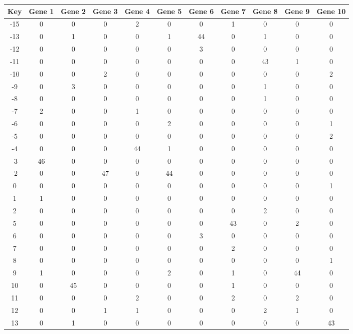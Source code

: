\begin{tabular}{|c|c|c|c|c|c|c|c|c|c|c|}
\hline
Key & Gene 1 & Gene 2 & Gene 3 & Gene 4 & Gene 5 & Gene 6 & Gene 7 & Gene 8 & Gene 9 & Gene 10 \\
\hline
-15 & 0 & 0 & 0 & 2 & 0 & 0 & 1 & 0 & 0 & 0 \\
-13 & 0 & 1 & 0 & 0 & 1 & 44 & 0 & 1 & 0 & 0 \\
-12 & 0 & 0 & 0 & 0 & 0 & 3 & 0 & 0 & 0 & 0 \\
-11 & 0 & 0 & 0 & 0 & 0 & 0 & 0 & 43 & 1 & 0 \\
-10 & 0 & 0 & 2 & 0 & 0 & 0 & 0 & 0 & 0 & 2 \\
-9 & 0 & 3 & 0 & 0 & 0 & 0 & 0 & 1 & 0 & 0 \\
-8 & 0 & 0 & 0 & 0 & 0 & 0 & 0 & 1 & 0 & 0 \\
-7 & 2 & 0 & 0 & 1 & 0 & 0 & 0 & 0 & 0 & 0 \\
-6 & 0 & 0 & 0 & 0 & 2 & 0 & 0 & 0 & 0 & 1 \\
-5 & 0 & 0 & 0 & 0 & 0 & 0 & 0 & 0 & 0 & 2 \\
-4 & 0 & 0 & 0 & 44 & 1 & 0 & 0 & 0 & 0 & 0 \\
-3 & 46 & 0 & 0 & 0 & 0 & 0 & 0 & 0 & 0 & 0 \\
-2 & 0 & 0 & 47 & 0 & 44 & 0 & 0 & 0 & 0 & 0 \\
0 & 0 & 0 & 0 & 0 & 0 & 0 & 0 & 0 & 0 & 1 \\
1 & 1 & 0 & 0 & 0 & 0 & 0 & 0 & 0 & 0 & 0 \\
2 & 0 & 0 & 0 & 0 & 0 & 0 & 0 & 2 & 0 & 0 \\
5 & 0 & 0 & 0 & 0 & 0 & 0 & 43 & 0 & 2 & 0 \\
6 & 0 & 0 & 0 & 0 & 0 & 3 & 0 & 0 & 0 & 0 \\
7 & 0 & 0 & 0 & 0 & 0 & 0 & 2 & 0 & 0 & 0 \\
8 & 0 & 0 & 0 & 0 & 0 & 0 & 0 & 0 & 0 & 1 \\
9 & 1 & 0 & 0 & 0 & 2 & 0 & 1 & 0 & 44 & 0 \\
10 & 0 & 45 & 0 & 0 & 0 & 0 & 1 & 0 & 0 & 0 \\
11 & 0 & 0 & 0 & 2 & 0 & 0 & 2 & 0 & 2 & 0 \\
12 & 0 & 0 & 1 & 1 & 0 & 0 & 0 & 2 & 1 & 0 \\
13 & 0 & 1 & 0 & 0 & 0 & 0 & 0 & 0 & 0 & 43 \\
\hline
\end{tabular}